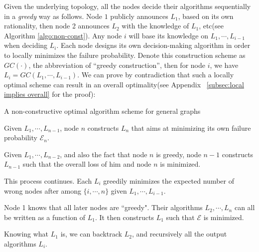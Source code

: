 \documentclass[a4paper,UKenglish]{lipics}
\theoremstyle{definition}
\begin{document}


Given the underlying topology, all the nodes decide their algorithms sequentially in a \emph{greedy} way as follows.
Node $1$ publicly announces $L_1$, based on its own rationality, then node 2 announces $L_2$ with the knowledge of $L_1$, etc(see Algorithm \ref{algo:non-const}). 
Any node $i$ will base its knowledge on $L_1, \dotsb, L_{i-1}$ when deciding $L_i$.
Each node designs its own decision-making algorithm in order to locally minimizes the failure probability.
Denote this construction scheme as $GC(\cdot)$, the abbreviation of ``greedy construction'', then for node $i$, we have $L_i = GC(L_1,\dotsb,L_{i-1})$.
We can prove by contradiction that such a locally optimal scheme can result in an overall optimality(see Appendix ~\ref{subsec:local implies overall} for the proof):


\begin{algorithm}[htb]
\caption{A non-constructive optimal algorithm scheme for general graphs}
\begin{algorithmic}[1]\label{algo:non-const}
\label{alg:greedy construction}
\STATE Given $L_1, \dotsb, L_{n-1}$, node $n$ constructs $L_n$ that aims at minimizing its own failure probability $\mathcal{E}_n$.

\STATE Given $L_1, \dotsb, L_{n-2}$, and also the fact that node $n$ is greedy,
		 node $n - 1$ constructs $L_{n-1}$ such that the overall loss of him and node $n$ is minimized.

\STATE This process continues. Each $L_i$ greedily minimizes the expected number of wrong nodes after among $\{i, \dotsb, n\}$
		 given $L_1, \dotsb, L_{i-1}$. 

\STATE Node 1 knows that all later nodes are ``greedy".
	Their algorithms $L_2, \dotsb, L_n$ can all be written as a function of $L_1$. 
	It then constructs $L_1$ such that $\mathcal{E}$ is minimized.

\STATE Knowing what $L_1$ is, we can backtrack $L_2$, and recursively all the output algorithms $L_i$.
\end{algorithmic}
\end{algorithm}
\end{document}
